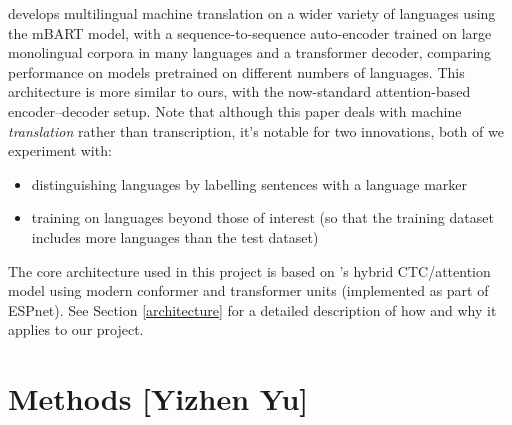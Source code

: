 \documentclass{article}
\begin{document}
  \cite{Liu} develops multilingual machine translation on a wider variety of languages using the mBART model, with a sequence-to-sequence auto-encoder trained on large monolingual corpora in many languages and a transformer decoder, comparing performance on models pretrained on different numbers of languages. This architecture is more similar to ours, with the now-standard attention-based encoder--decoder setup. Note that although this paper deals with machine \emph{translation} rather than transcription, it's notable for two innovations, both of we experiment with:
  \begin{itemize}
    \item distinguishing languages by labelling sentences with a language marker
    \item training on languages beyond those of interest (so that the training dataset includes more languages than the test dataset)
  \end{itemize}
  The core architecture used in this project is based on \cite{Kim}'s hybrid CTC/attention model using modern conformer and transformer units (implemented as part of ESPnet). See Section \ref{architecture} for a detailed description of how and why it applies to our project.
  \section{Methods [Yizhen Yu]}
\end{document}
